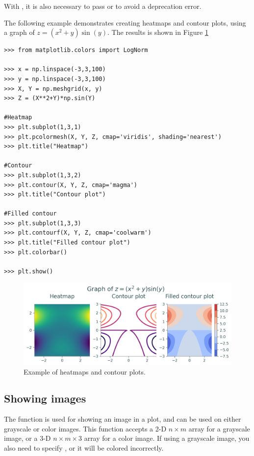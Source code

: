 With , it is also necessary to pass  or  to avoid a deprecation error.

The following example demonstrates creating heatmaps and contour plots, using a graph of $z=(x^2+y)\sin(y)$.
The results is shown in Figure \ref{mpl:contour}
\begin{lstlisting}
>>> from matplotlib.colors import LogNorm

>>> x = np.linspace(-3,3,100)
>>> y = np.linspace(-3,3,100)
>>> X, Y = np.meshgrid(x, y)
>>> Z = (X**2+Y)*np.sin(Y)

#Heatmap
>>> plt.subplot(1,3,1)
>>> plt.pcolormesh(X, Y, Z, cmap='viridis', shading='nearest')
>>> plt.title("Heatmap")

#Contour
>>> plt.subplot(1,3,2)
>>> plt.contour(X, Y, Z, cmap='magma')
>>> plt.title("Contour plot")

#Filled contour
>>> plt.subplot(1,3,3)
>>> plt.contourf(X, Y, Z, cmap='coolwarm')
>>> plt.title("Filled contour plot")
>>> plt.colorbar()

>>> plt.show()

\end{lstlisting}
\begin{figure}[H]
\centering
\includegraphics[width=\textwidth]{figures/heat_contour_example.png}
\caption{Example of heatmaps and contour plots.}
\label{mpl:contour}
\end{figure}

\subsection*{Showing images}
The function  is used for showing an image in a plot, and can be used on either grayscale or color images.
This function accepts a 2-D $n\times m$ array for a grayscale image, or a 3-D $n\times m \times 3$ array for a color image.
If using a grayscale image, you also need to specify , or it will be colored incorrectly.

